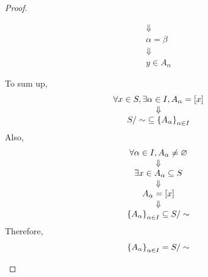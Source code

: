 \begin{proof}
\begin{enumerate}[label=\textbf{(\Alph*)}]
\begin{itemize}
\[\begin{array}{c}
                \Downarrow \\
                \alpha = \beta \\
                \Downarrow \\
                y \in A_{\alpha}
            \end{array}
            \]
        \end{itemize}
        To sum up,
        \[
        \begin{array}{c}
            \forall x \in S, \exists \alpha \in I, A_{\alpha} = [x] \\
            \Downarrow \\
            S / \sim \; \subseteq \set*{A_{\alpha}}_{\alpha \in I}
        \end{array}
        \]
        Also,
        \[
        \begin{array}{c}
            \forall \alpha \in I, A_{\alpha} \neq \vnot \\
            \Downarrow \\
            \exists x \in A_{\alpha} \subseteq S \\
            \Downarrow \\
            A_{\alpha} = [x] \\
            \Downarrow \\
            \set*{A_{\alpha}}_{\alpha \in I} \subseteq S / \sim
        \end{array}
        \]
        Therefore,
        \[
        \set*{A_{\alpha}}_{\alpha \in I} = S / \sim
        \]
    \end{enumerate}
\end{proof}
